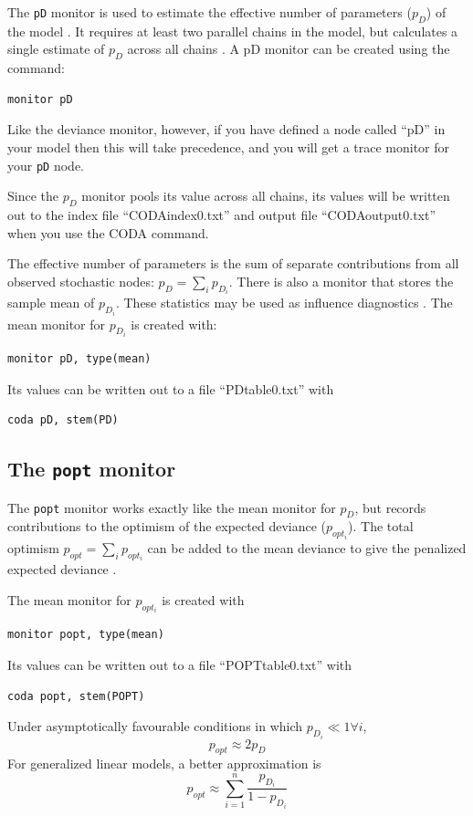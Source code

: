 \documentclass[11pt, a4paper, titlepage]{report}
\begin{document}
{The \verb+pD+ monitor is used to estimate the effective number of
parameters ($p_D$) of the model \citep{spiegelhalter:etal:2002}. It
requires at least two parallel chains in the model, but calculates
a single estimate of $p_D$ across all chains \citep{plummer:2002}.
A pD monitor can be created using the command:
\begin{verbatim}
monitor pD
\end{verbatim}
Like the deviance monitor, however, if you have defined a node called
``pD'' in your model then this will take precedence, and you will get
a trace monitor for your \verb+pD+ node.

Since the $p_D$ monitor pools its value across all chains, its values
will be written out to the index file ``CODAindex0.txt'' and
output file ``CODAoutput0.txt'' when you use the CODA command.

The effective number of parameters is the sum of separate contributions
from all observed stochastic nodes: $p_D = \sum_i p_{D_i}$. There is
also a monitor that stores the sample mean of $p_{D_i}$. These statistics
may be used as influence diagnostics \citep{spiegelhalter:etal:2002}.
The mean monitor for $p_{D_i}$ is created with:
\begin{verbatim}
monitor pD, type(mean)
\end{verbatim}
Its values can be written out to a file ``PDtable0.txt'' with
\begin{verbatim}
coda pD, stem(PD)
\end{verbatim}

\subsection{The \texttt{popt} monitor}

The \texttt{popt} monitor works exactly like the mean monitor for $p_D$,
but records contributions to the optimism of the expected deviance
($p_{opt_i}$). The total optimism $p_{opt} = \sum_i p_{opt_i}$  can be
added to the mean deviance to give the penalized expected deviance
\citep{plummer:2008}.

The mean monitor for $p_{opt_i}$ is created with
\begin{verbatim}
monitor popt, type(mean)
\end{verbatim}
Its values can be written out to a file ``POPTtable0.txt'' with
\begin{verbatim}
coda popt, stem(POPT)
\end{verbatim}
Under asymptotically favourable conditions in which $p_{D_i} \ll 1
\forall i$,
\[
p_{opt} \approx 2 p_D
\]
For generalized linear models, a better approximation is
\[
p_{opt} \approx \sum_{i=1}^n \frac {p_{D_i}}{1 - p_{D_i}}
\]

}
\end{document}
